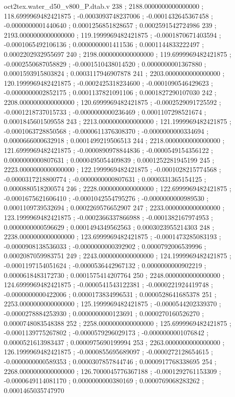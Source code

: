 \begin{filecontents}[overwrite]{oct2tex.water_d50_v800_P.dtab.v}
238 ; 2188.0000000000000000 ; 118.6999969482421875 ; -0.0003093748237006 ; -0.0001432645367458 ; -0.0000000001440640 ; 0.0001256851828657 ; 0.0002591542724986
239 ; 2193.0000000000000000 ; 119.1999969482421875 ; -0.0001870671403594 ; -0.0001065492106136 ; 0.0000000001411536 ; 0.0001144833222497 ; 0.0002202932955697
240 ; 2198.0000000000000000 ; 119.6999969482421875 ; -0.0002550687058829 ; -0.0001510438014520 ; 0.0000000001367880 ; 0.0001593915803824 ; 0.0003117946907878
241 ; 2203.0000000000000000 ; 120.1999969482421875 ; -0.0002425318234600 ; -0.0001090546429623 ; -0.0000000002852175 ; 0.0001137821091106 ; 0.0001827290107030
242 ; 2208.0000000000000000 ; 120.6999969482421875 ; -0.0002529091725592 ; -0.0001218737015733 ; -0.0000000000236469 ; 0.0001107298521674 ; 0.0001845601509558
243 ; 2213.0000000000000000 ; 121.1999969482421875 ; -0.0001063728850568 ; -0.0000611376308370 ; -0.0000000000334694 ; 0.0000666000632918 ; 0.0001499219506513
244 ; 2218.0000000000000000 ; 121.6999969482421875 ; -0.0000890978844836 ; -0.0000549154356122 ; 0.0000000000807631 ; 0.0000495054409839 ; 0.0001252281945199
245 ; 2223.0000000000000000 ; 122.1999969482421875 ; -0.0001028215774568 ; -0.0000317218800774 ; -0.0000000000807631 ; 0.0000331365154125 ; 0.0000880518200574
246 ; 2228.0000000000000000 ; 122.6999969482421875 ; -0.0001675621606410 ; -0.0001042554795276 ; -0.0000000000989530 ; 0.0001109739532694 ; 0.0002269576652907
247 ; 2233.0000000000000000 ; 123.1999969482421875 ; -0.0002366337866988 ; -0.0001382167974953 ; 0.0000000000596629 ; 0.0001494349562563 ; 0.0003023955214303
248 ; 2238.0000000000000000 ; 123.6999969482421875 ; -0.0001473285083193 ; -0.0000908138536033 ; -0.0000000000392902 ; 0.0000792006539996 ; 0.0002087059983751
249 ; 2243.0000000000000000 ; 124.1999969482421875 ; -0.0001197154051624 ; -0.0000536442967132 ; 0.0000000000902219 ; 0.0000618483172730 ; 0.0001575414207764
250 ; 2248.0000000000000000 ; 124.6999969482421875 ; -0.0000541543122381 ; -0.0000221924419748 ; -0.0000000000422006 ; 0.0000173834996531 ; 0.0000528641685378
251 ; 2253.0000000000000000 ; 125.1999969482421875 ; -0.0000544202339370 ; -0.0000278884253930 ; 0.0000000000123691 ; 0.0000270160526270 ; 0.0000748083548388
252 ; 2258.0000000000000000 ; 125.6999969482421875 ; -0.0001139775267802 ; -0.0000579296029173 ; -0.0000000001076842 ; 0.0000521613983437 ; 0.0000975690199994
253 ; 2263.0000000000000000 ; 126.1999969482421875 ; -0.0000855695689097 ; -0.0000272128654615 ; -0.0000000000589353 ; 0.0000307857844746 ; 0.0000917768338695
254 ; 2268.0000000000000000 ; 126.7000045776367188 ; -0.0001292761153309 ; -0.0000649114081170 ; 0.0000000000380169 ; 0.0000769068283262 ; 0.0001465035747970

\end{filecontents}
